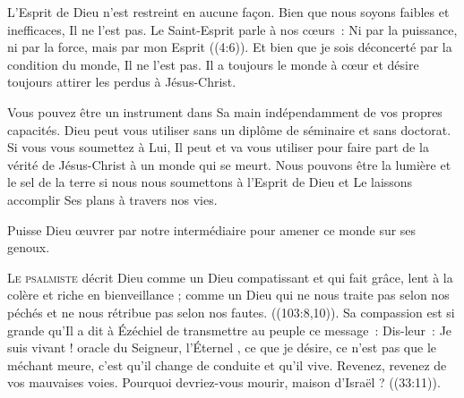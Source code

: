 L'Esprit de Dieu n'est restreint en aucune fa\c{c}on.
 Bien que nous soyons faibles et inefficaces, Il ne l'est pas.
 Le Saint-Esprit parle à nos c\oe{}urs~: 
 \Og Ni par la puissance, ni par la force, mais par mon Esprit \Fg{}
 ((4:6)).
 Et bien que je sois déconcerté par la condition du monde, Il ne l'est pas.
 Il a toujours le monde à c\oe{}ur et désire toujours attirer
 les perdus à Jésus-Christ. 

Vous pouvez être un instrument dans Sa main indépendamment
 de vos propres capacités. Dieu peut vous utiliser sans un diplôme
 de séminaire et sans doctorat. Si vous vous soumettez à Lui,
 Il peut et va vous utiliser pour faire part de la vérité de Jésus-Christ
 à un monde qui se meurt. Nous pouvons être la lumière
 et le sel de la terre si nous nous soumettons à l'Esprit de Dieu
 et Le laissons accomplir Ses plans à travers nos vies. 

Puisse Dieu \oe{}uvrer par notre intermédiaire pour amener ce monde sur ses genoux.

\dvrule






\lettrine{L}{e psalmiste} décrit Dieu comme un Dieu \Og compatissant
 et qui fait grâce, lent à la colère et riche en bienveillance \Fg{} ;
 comme un Dieu \Og qui ne nous traite pas selon nos péchés et ne nous rétribue pas
 selon nos fautes. \Fg{} ((103:8,10)).
 Sa compassion est si grande qu'Il a dit à Ézéchiel de transmettre au peuple
 ce message~: Dis-leur~:  \Og Je suis vivant !
 \ocadr oracle du Seigneur, l'Éternel \fcadr{}, ce que je désire,
 ce n'est pas que le méchant meure, c'est qu'il change de conduite
 et qu'il vive. Revenez, revenez de vos mauvaises voies.
 Pourquoi devriez-vous mourir, maison d'Israël ? \Fg{} ((33:11)). 

